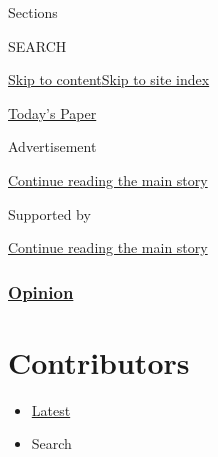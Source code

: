 Sections

SEARCH

\protect\hyperlink{site-content}{Skip to
content}\protect\hyperlink{site-index}{Skip to site index}

\href{https://myaccount.nytimes3xbfgragh.onion/auth/login?response_type=cookie\&client_id=vi}{}

\href{https://www.nytimes3xbfgragh.onion/section/todayspaper}{Today's
Paper}

Advertisement

\protect\hyperlink{after-top}{Continue reading the main story}

Supported by

\protect\hyperlink{after-sponsor}{Continue reading the main story}

\hypertarget{opinion}{%
\subsubsection{\texorpdfstring{\href{/section/opinion}{Opinion}}{Opinion}}\label{opinion}}

\hypertarget{contributors}{%
\section{Contributors}\label{contributors}}

\begin{itemize}
\tightlist
\item
  \protect\hyperlink{stream-panel}{Latest}
\item
  Search
\end{itemize}


